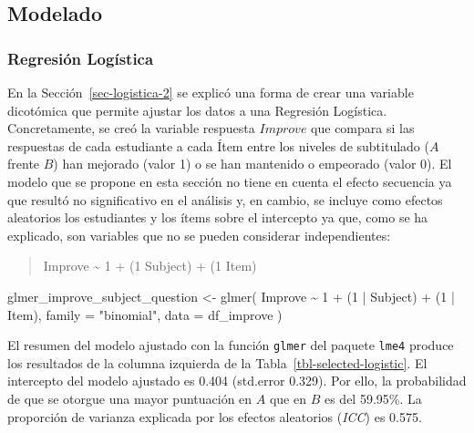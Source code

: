 \documentclass[
  12pt,
  a4paper,
  extrafontsizes,
  onecolumn,
  openright,
  table]{memoir}
\newenvironment{Shaded}{\begin{snugshade}}{\end{snugshade}}
\newcommand{\AttributeTok}[1]{\textcolor[rgb]{0.40,0.45,0.13}{#1}}
\newcommand{\DecValTok}[1]{\textcolor[rgb]{0.68,0.00,0.00}{#1}}
\newcommand{\FunctionTok}[1]{\textcolor[rgb]{0.28,0.35,0.67}{#1}}
\newcommand{\NormalTok}[1]{\textcolor[rgb]{0.00,0.23,0.31}{#1}}
\newcommand{\OtherTok}[1]{\textcolor[rgb]{0.00,0.23,0.31}{#1}}
\newcommand{\SpecialCharTok}[1]{\textcolor[rgb]{0.37,0.37,0.37}{#1}}
\newcommand{\StringTok}[1]{\textcolor[rgb]{0.13,0.47,0.30}{#1}}
\begin{document}
\hypertarget{modelado}{%
\subsection{Modelado}\label{modelado}}

\hypertarget{sec-logistica-3}{%
\subsubsection{Regresión Logística}\label{sec-logistica-3}}

En la Sección~\ref{sec-logistica-2} se explicó una forma de crear una
variable dicotómica que permite ajustar los datos a una Regresión
Logística. Concretamente, se creó la variable respuesta \(Improve\) que
compara si las respuestas de cada estudiante a cada Ítem entre los
niveles de subtitulado (\(A\) frente \(B\)) han mejorado (valor 1) o se
han mantenido o empeorado (valor 0). El modelo que se propone en esta
sección no tiene en cuenta el \gls{efecto secuencia} ya que resultó no
significativo en el análisis y, en cambio, se incluye como efectos
aleatorios los estudiantes y los ítems sobre el intercepto ya que, como
se ha explicado, son variables que no se pueden considerar
independientes:

\begin{quote}
Improve \textasciitilde{} 1 + (1 \textbar{} Subject) + (1 \textbar{}
Item)
\end{quote}

\scriptsize

\begin{Shaded}
\begin{Highlighting}[]
\NormalTok{glmer\_improve\_subject\_question }\OtherTok{\textless{}{-}} \FunctionTok{glmer}\NormalTok{(}
\NormalTok{    Improve }\SpecialCharTok{\textasciitilde{}} \DecValTok{1} \SpecialCharTok{+}\NormalTok{ (}\DecValTok{1} \SpecialCharTok{|}\NormalTok{ Subject) }\SpecialCharTok{+}\NormalTok{ (}\DecValTok{1} \SpecialCharTok{|}\NormalTok{ Item),}
    \AttributeTok{family =} \StringTok{"binomial"}\NormalTok{, }\AttributeTok{data =}\NormalTok{ df\_improve}
\NormalTok{)}
\end{Highlighting}
\end{Shaded}

\normalsize

El resumen del modelo ajustado con la función \texttt{glmer} del paquete
\texttt{lme4} \autocite[ver][]{lme4} produce los resultados de la
columna izquierda de la Tabla~\ref{tbl-selected-logistic}. El intercepto
del modelo ajustado es 0.404 (std.error 0.329). Por ello, la
probabilidad de que se otorgue una mayor puntuación en \(A\) que en
\(B\) es del 59.95\%. La proporción de varianza explicada por los
efectos aleatorios (\emph{\gls{ICC}}) es 0.575.
\end{document}

